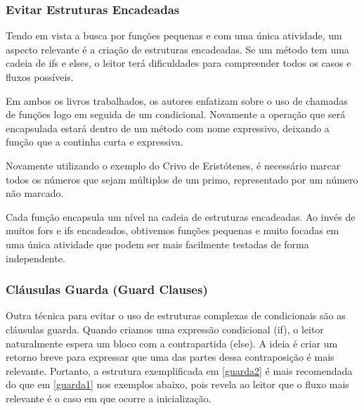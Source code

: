 

\subsubsection{Evitar Estruturas Encadeadas}
Tendo em vista a busca por funções pequenas e com uma única atividade, um aspecto relevante é a criação de estruturas encadeadas. Se um método tem uma cadeia de ifs e elses, o leitor terá dificuldades para compreender todos os casos e fluxos possíveis.
	
Em ambos os livros trabalhados, os autores enfatizam sobre o uso de chamadas de funções logo em seguida de um condicional. Novamente a operação que será encapsulada estará dentro de um método com nome expressivo, deixando a função que a continha curta e expressiva.
	
Novamente utilizando o exemplo do Crivo de Eristótenes, é necessário marcar todos os números que sejam múltiplos de um primo, representado por um número não marcado.



Cada função encapsula um nível na cadeia de estruturas encadeadas. Ao invés de muitos fors e ifs encadeados, obtivemos funções pequenas e muito focadas em uma única atividade que podem ser mais facilmente testadas de forma independente.

\subsubsection{Cláusulas Guarda (Guard Clauses)}
Outra técnica para evitar o uso de estruturas complexas de condicionais são as cláusulas guarda. Quando criamos uma expressão condicional (if), o leitor naturalmente espera um bloco com a contrapartida (else). A ideia é criar um retorno breve para expressar que uma das partes dessa contraposição é mais relevante. Portanto, a estrutura exemplificada em \ref{guarda2} é mais recomendada do que em \ref{guarda1} nos exemplos abaixo, pois revela ao leitor que o fluxo mais relevante é o caso em que ocorre a inicialização.





